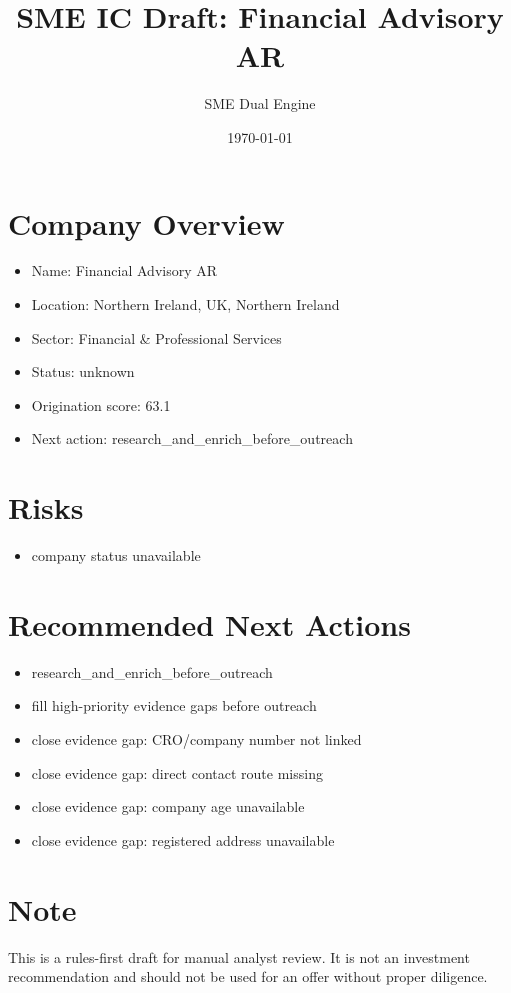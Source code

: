 \documentclass[11pt,a4paper]{article}
\title{SME IC Draft: Financial Advisory AR}
\author{SME Dual Engine}
\date{\today}
\begin{document}
\maketitle
\section*{Company Overview}
\begin{itemize}[leftmargin=1.4em]
\item Name: Financial Advisory AR
\item Location: Northern Ireland, UK, Northern Ireland
\item Sector: Financial \& Professional Services
\item Status: unknown
\item Origination score: 63.1
\item Next action: research\_and\_enrich\_before\_outreach
\end{itemize}
\section*{Risks}
\begin{itemize}[leftmargin=1.4em]
\item company status unavailable
\end{itemize}
\section*{Recommended Next Actions}
\begin{itemize}[leftmargin=1.4em]
\item research\_and\_enrich\_before\_outreach
\item fill high-priority evidence gaps before outreach
\item close evidence gap: CRO/company number not linked
\item close evidence gap: direct contact route missing
\item close evidence gap: company age unavailable
\item close evidence gap: registered address unavailable
\end{itemize}
\section*{Note}
This is a rules-first draft for manual analyst review. It is not an investment
recommendation and should not be used for an offer without proper diligence.
\end{document}

